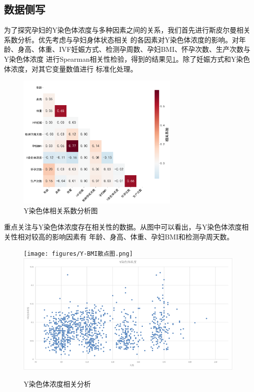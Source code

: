 \documentclass[withoutpreface,notoc]{cumcmthesis}
\begin{document}
	\subsection{数据侧写}

	为了探究孕妇的Y染色体浓度与多种因素之间的关系，我们首先进行斯皮尔曼相关系数分析。优先考虑与孕妇身体状态相关
	的各因素对Y染色体浓度的影响。对年龄、身高、体重、IVF妊娠方式、检测孕周数、孕妇BMI、怀孕次数、生产次数与Y染色体浓度
	进行Spearman相关性检验，得到的结果见\cref{Y染色体相关系数}。除了妊娠方式和Y染色体浓度，对其它变量数值进行
	标准化处理。

	\begin{figure}[ht]
		\centering
		\includegraphics[width=0.7\textwidth]{figures/spearman5.png} 
		\caption{Y染色体相关系数分析图}
		\label{Y染色体相关系数}
	\end{figure}
	重点关注与Y染色体浓度存在相关性的数据。从图中可以看出，与Y染色体浓度相关性相对较高的影响因素有
	年龄、身高、体重、孕妇BMI和检测孕周天数。




	\begin{figure}[H]
		\centering
		{\texttt{[image: figures/Y-BMI散点图.png]}}
		\hfill %
		{\includegraphics[width=.45\textwidth]{figures/Y-天数散点.png}}
		\caption{Y染色体浓度相关分析}
		\label{fig:Y染色体浓度与其他数据}
	\end{figure}
\end{document}

